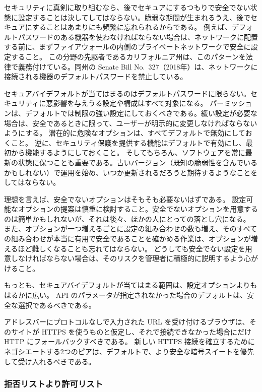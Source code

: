 \documentclass[uplatex]{jsarticle}
\def\label#1{}%
\begin{document}
セキュリティに真剣に取り組むなら、後でセキュアにするつもりで安全でない状態に設定することは決してしてはならない。脆弱な期間が生まれるうえ、後でセキュアにすることはあまりにも頻繁に忘れられるからである。
例えば、デフォルトパスワードのある機器を使わなければならない場合は、ネットワークに配置する前に、まずファイアウォールの内側のプライベートネットワークで安全に設定すること。
この分野の先駆者であるカリフォルニア州は、このパターンを法律で義務付けている。同州の Senate Bill No.~327（2018年）は、ネットワークに接続される機器のデフォルトパスワードを禁止している。

セキュアバイデフォルトが当てはまるのはデフォルトパスワードに限らない。セキュリティに悪影響を与えうる設定や構成はすべて対象になる。
パーミッションは、デフォルトでは制限の強い設定にしておくべきである。緩い設定が必要な場合は、安全であるときに限って、ユーザーが明示的に変更しなければならないようにする。
潜在的に危険なオプションは、すべてデフォルトで無効にしておくこと。
逆に、セキュリティ保護を提供する機能はデフォルトで有効にし、最初から機能するようにしておくこと。
そしてもちろん、ソフトウェアを常に最新の状態に保つことも重要である。古いバージョン（既知の脆弱性を含んでいるかもしれない）で運用を始め、いつか更新されるだろうと期待するようなことをしてはならない。

理想を言えば、安全でないオプションはそもそも必要ないはずである。
設定可能なオプションの提案は慎重に検討すること。安全でないオプションを用意するのは簡単かもしれないが、それは後々、ほかの人にとっての落とし穴になる。
また、オプションが一つ増えるごとに設定の組み合わせの数も増え、そのすべての組み合わせが本当に有用で安全であることを確かめる作業は、オプションが増えるほど難しくなることも忘れてはならない。
どうしても安全でない設定を用意しなければならない場合は、そのリスクを管理者に積極的に説明するよう心がけること。

もっとも、セキュアバイデフォルトが当てはまる範囲は、設定オプションよりもはるかに広い。
API のパラメータが指定されなかった場合のデフォルトは、安全な選択であるべきである。

\begin{exa}\label{exa:ch4-https-default}
アドレスバーにプロトコルなしで入力された URL を受け付けるブラウザは、そのサイトが HTTPS を使うものと仮定し、それで接続できなかった場合にだけ HTTP にフォールバックすべきである。
新しい HTTPS 接続を確立するためにネゴシエートする2つのピアは、デフォルトで、より安全な暗号スイートを優先して受け入れるべきである。
\end{exa}

\subsubsection{拒否リストより許可リスト}
\end{document}
